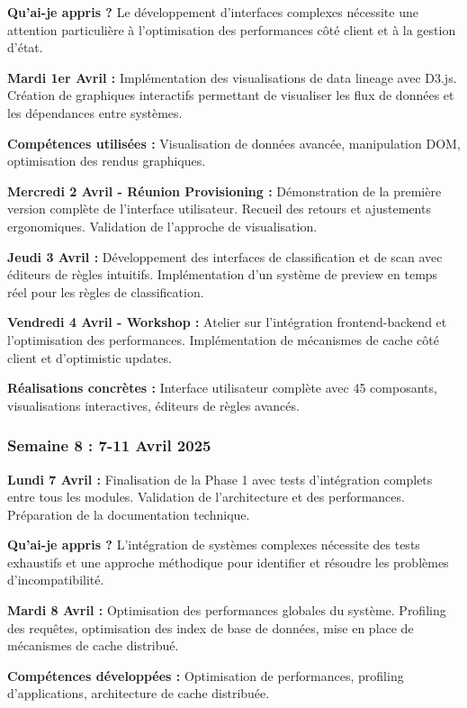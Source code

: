 \documentclass[a4paper,12pt]{article}
\begin{document}
\textbf{Qu'ai-je appris ?} Le développement d'interfaces complexes nécessite une attention particulière à l'optimisation des performances côté client et à la gestion d'état.

\textbf{Mardi 1er Avril :}
Implémentation des visualisations de data lineage avec D3.js. Création de graphiques interactifs permettant de visualiser les flux de données et les dépendances entre systèmes.

\textbf{Compétences utilisées :} Visualisation de données avancée, manipulation DOM, optimisation des rendus graphiques.

\textbf{Mercredi 2 Avril - Réunion Provisioning :}
Démonstration de la première version complète de l'interface utilisateur. Recueil des retours et ajustements ergonomiques. Validation de l'approche de visualisation.

\textbf{Jeudi 3 Avril :}
Développement des interfaces de classification et de scan avec éditeurs de règles intuitifs. Implémentation d'un système de preview en temps réel pour les règles de classification.

\textbf{Vendredi 4 Avril - Workshop :}
Atelier sur l'intégration frontend-backend et l'optimisation des performances. Implémentation de mécanismes de cache côté client et d'optimistic updates.

\textbf{Réalisations concrètes :} Interface utilisateur complète avec 45 composants, visualisations interactives, éditeurs de règles avancés.

\subsubsection{Semaine 8 : 7-11 Avril 2025}

\textbf{Lundi 7 Avril :}
Finalisation de la Phase 1 avec tests d'intégration complets entre tous les modules. Validation de l'architecture et des performances. Préparation de la documentation technique.

\textbf{Qu'ai-je appris ?} L'intégration de systèmes complexes nécessite des tests exhaustifs et une approche méthodique pour identifier et résoudre les problèmes d'incompatibilité.

\textbf{Mardi 8 Avril :}
Optimisation des performances globales du système. Profiling des requêtes, optimisation des index de base de données, mise en place de mécanismes de cache distribué.

\textbf{Compétences développées :} Optimisation de performances, profiling d'applications, architecture de cache distribuée.
\end{document}
